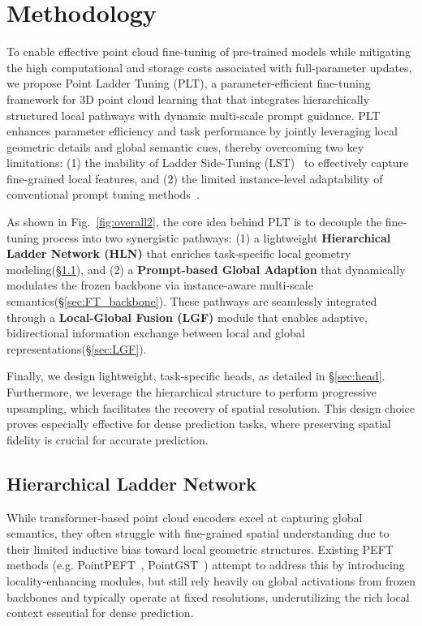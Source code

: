 


\section{Methodology}
\label{sec:methodology}

To enable effective point cloud fine-tuning of pre-trained models while mitigating the high computational and storage costs associated with full-parameter updates, we propose Point Ladder Tuning (PLT), a parameter-efficient fine-tuning framework for 3D point cloud learning that that integrates hierarchically structured local pathways with dynamic multi-scale prompt guidance. PLT enhances parameter efficiency and task performance by jointly leveraging local geometric details and global semantic cues, thereby overcoming two key limitations: (1) the inability of Ladder Side-Tuning (LST)~\cite{sung2022lst} to effectively capture fine-grained local features, and (2) the limited instance-level adaptability of conventional prompt tuning methods~\cite{li2021prefix}.

As shown in Fig.~\ref{fig:overall2}, the core idea behind PLT is to decouple the fine-tuning process into two synergistic pathways: (1) a lightweight \textbf{Hierarchical Ladder Network (HLN)} that enriches task-specific local geometry modeling(\S\ref{sec:HLN}), and (2) a \textbf{Prompt-based Global Adaption} that dynamically modulates the frozen backbone via instance-aware multi-scale semantics(\S\ref{sec:FT_backbone}). These pathways are seamlessly integrated through a \textbf{Local-Global Fusion (LGF)} module that enables adaptive, bidirectional information exchange between local and global representations(\S\ref{sec:LGF}).

Finally, we design lightweight, task-specific heads, as detailed in \S\ref{sec:head}. Furthermore, we leverage the hierarchical structure to perform progressive upsampling, which facilitates the recovery of spatial resolution. This design choice proves especially effective for dense prediction tasks, where preserving spatial fidelity is crucial for accurate prediction.

\subsection{Hierarchical Ladder Network}
\label{sec:HLN}

While transformer-based point cloud encoders excel at capturing global semantics, they often struggle with fine-grained spatial understanding due to their limited inductive bias toward local geometric structures. Existing PEFT methods (e.g. PointPEFT~\cite{tang2024point}, PointGST~\cite{liang2024parameter}) attempt to address this by introducing locality-enhancing modules, but still rely heavily on global activations from frozen backbones and typically operate at fixed resolutions, underutilizing the rich local context essential for dense prediction.

